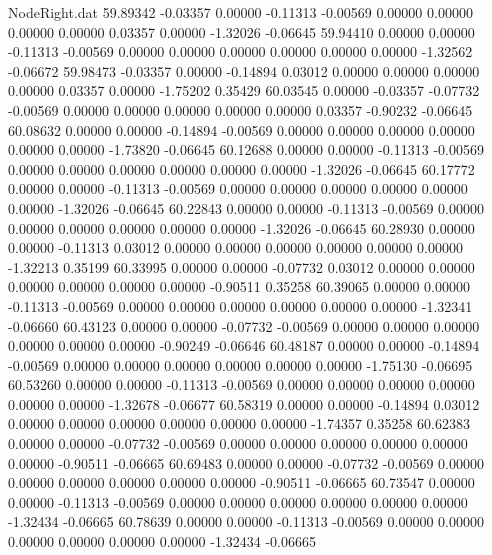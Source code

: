 \begin{filecontents}{NodeRight.dat}
  59.89342   -0.03357    0.00000    -0.11313   -0.00569    0.00000    0.00000    0.00000    0.00000    0.03357    0.00000   -1.32026   -0.06645
  59.94410    0.00000    0.00000    -0.11313   -0.00569    0.00000    0.00000    0.00000    0.00000    0.00000    0.00000   -1.32562   -0.06672
  59.98473   -0.03357    0.00000    -0.14894    0.03012    0.00000    0.00000    0.00000    0.00000    0.03357    0.00000   -1.75202    0.35429
  60.03545    0.00000   -0.03357    -0.07732   -0.00569    0.00000    0.00000    0.00000    0.00000    0.00000    0.03357   -0.90232   -0.06645
  60.08632    0.00000    0.00000    -0.14894   -0.00569    0.00000    0.00000    0.00000    0.00000    0.00000    0.00000   -1.73820   -0.06645
  60.12688    0.00000    0.00000    -0.11313   -0.00569    0.00000    0.00000    0.00000    0.00000    0.00000    0.00000   -1.32026   -0.06645
  60.17772    0.00000    0.00000    -0.11313   -0.00569    0.00000    0.00000    0.00000    0.00000    0.00000    0.00000   -1.32026   -0.06645
  60.22843    0.00000    0.00000    -0.11313   -0.00569    0.00000    0.00000    0.00000    0.00000    0.00000    0.00000   -1.32026   -0.06645
  60.28930    0.00000    0.00000    -0.11313    0.03012    0.00000    0.00000    0.00000    0.00000    0.00000    0.00000   -1.32213    0.35199
  60.33995    0.00000    0.00000    -0.07732    0.03012    0.00000    0.00000    0.00000    0.00000    0.00000    0.00000   -0.90511    0.35258
  60.39065    0.00000    0.00000    -0.11313   -0.00569    0.00000    0.00000    0.00000    0.00000    0.00000    0.00000   -1.32341   -0.06660
  60.43123    0.00000    0.00000    -0.07732   -0.00569    0.00000    0.00000    0.00000    0.00000    0.00000    0.00000   -0.90249   -0.06646
  60.48187    0.00000    0.00000    -0.14894   -0.00569    0.00000    0.00000    0.00000    0.00000    0.00000    0.00000   -1.75130   -0.06695
  60.53260    0.00000    0.00000    -0.11313   -0.00569    0.00000    0.00000    0.00000    0.00000    0.00000    0.00000   -1.32678   -0.06677
  60.58319    0.00000    0.00000    -0.14894    0.03012    0.00000    0.00000    0.00000    0.00000    0.00000    0.00000   -1.74357    0.35258
  60.62383    0.00000    0.00000    -0.07732   -0.00569    0.00000    0.00000    0.00000    0.00000    0.00000    0.00000   -0.90511   -0.06665
  60.69483    0.00000    0.00000    -0.07732   -0.00569    0.00000    0.00000    0.00000    0.00000    0.00000    0.00000   -0.90511   -0.06665
  60.73547    0.00000    0.00000    -0.11313   -0.00569    0.00000    0.00000    0.00000    0.00000    0.00000    0.00000   -1.32434   -0.06665
  60.78639    0.00000    0.00000    -0.11313   -0.00569    0.00000    0.00000    0.00000    0.00000    0.00000    0.00000   -1.32434   -0.06665

\end{filecontents}
